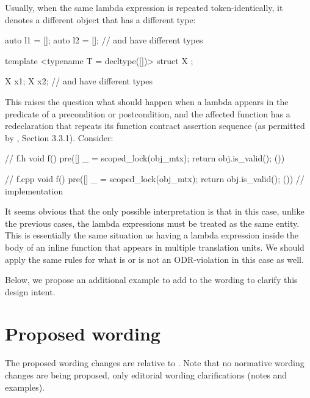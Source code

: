 Usually, when the same lambda expression is repeated token-identically, it denotes a different object that has a different type:
\begin{codeblock}
auto l1 = []{};  
auto l2 = []{};
//  and  have different types

template <typename T = decltype([]{})>
struct X {};

X x1;
X x2;
//  and  have different types
\end{codeblock}
This raises the question what should happen when a lambda appears in the predicate of a precondition or postcondition, and the affected function has a redeclaration that repeats its function contract assertion sequence (as permitted by \cite{P2900R10}, Section 3.3.1). Consider:
\begin{codeblock}
// f.h
void f() pre([]{ _ = scoped_lock(obj_mtx); return obj.is_valid(); }())

// f.cpp  
void f() pre([]{ _ = scoped_lock(obj_mtx); return obj.is_valid(); }()) {
  // implementation
}
\end{codeblock}
It seems obvious that the only possible interpretation is that in this case, unlike the previous cases, the lambda expressions must be treated as the same entity. This is essentially the same situation as having a lambda expression inside the body of an inline function that appears in multiple translation units. We should apply the same rules for what is or is not an ODR-violation in this case as well.

Below, we propose an additional example to add to the wording to clarify this design intent.

\section{Proposed wording}

The proposed wording changes are relative to \cite{P2900R10}. Note that no normative wording changes are being proposed, only editorial wording clarifications (notes and examples).



